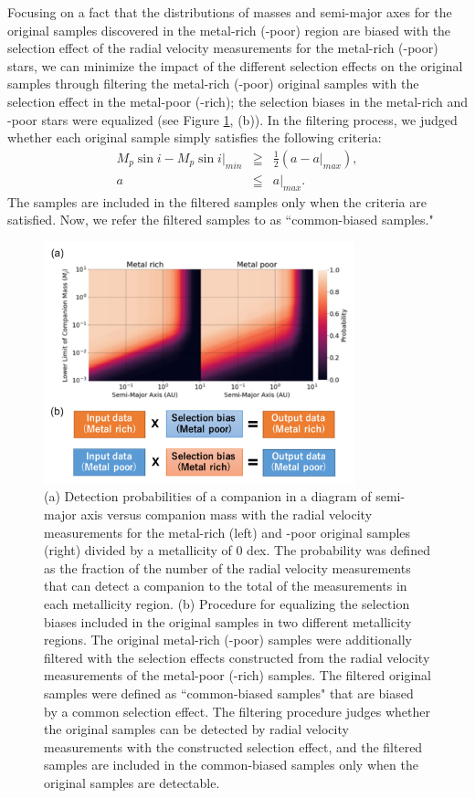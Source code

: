 \documentclass[twocolumn, dvipdfmx]{aastex62}
\begin{document}
\begin{CJK*}{UTF8}{min}
Focusing on a fact that the distributions of masses and semi-major axes for the original samples discovered in the metal-rich (-poor) region are biased with the selection effect of the radial velocity measurements for the metal-rich (-poor) stars, we can minimize the impact of the different selection effects on the original samples through filtering the metal-rich (-poor) original samples with the selection effect in the metal-poor (-rich); the selection biases in the metal-rich and -poor stars were equalized (see Figure \ref{fig:bias}, (b)). In the filtering process, we judged whether each original sample simply satisfies the following criteria:
\begin{eqnarray}
M_p\sin{i}-M_p\sin{i}|_{min} &\geqq& \frac{1}{2}(a-a|_{max}) , \\
a &\leqq& a|_{max} .
\end{eqnarray}
The samples are included in the filtered samples only when the criteria are satisfied. Now, we refer the filtered samples to as ``common-biased samples."

\begin{figure}[t]
\begin{center}
\includegraphics[width=9cm]{../../../Figure/selection_bias.pdf}
\caption{(a) Detection probabilities of a companion in a diagram of semi-major axis versus companion mass with the radial velocity measurements for the metal-rich (left) and -poor original samples (right) divided by a metallicity of 0 dex. The probability was defined as the fraction of the number of the radial velocity measurements that can detect a companion to the total of the measurements in each metallicity region. (b) Procedure for equalizing the selection biases included in the original samples in two different metallicity regions. The original metal-rich (-poor) samples were additionally filtered with the selection effects constructed from the radial velocity measurements of the metal-poor (-rich) samples. The filtered original samples were defined as ``common-biased samples" that are biased by a common selection effect. The filtering procedure judges whether the original samples can be detected by radial velocity measurements with the constructed selection effect, and the filtered samples are included in the common-biased samples only when the original samples are detectable. \label{fig:bias}}
\end{center}
\end{figure}



\end{CJK*}
\end{document}
